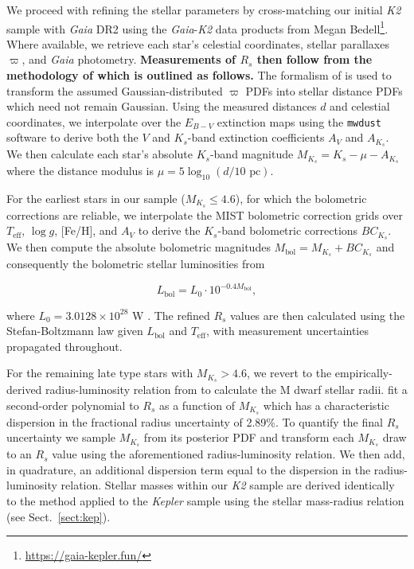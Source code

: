 \documentclass[twocolumn]{emulateapj}
\newcommand{\gaia}[1]{\emph{Gaia}#1}
\newcommand{\kepler}[1]{\emph{Kepler}#1}
\newcommand{\ktwo}[1]{\emph{K2}#1}
\newcommand{\teff}[1]{$T_{\text{eff}}$#1}
\newcommand{\logg}[1]{$\log{g}$#1}
\begin{document}
We proceed with refining the stellar parameters by cross-matching our initial \ktwo{} sample with \gaia{}  
DR2 using the \gaia{-}\ktwo{} data products from Megan Bedell\footnote{\url{https://gaia-kepler.fun/}}. Where
available, we retrieve each star's celestial coordinates, stellar parallaxes $\varpi$, and \gaia{} photometry.
\textbf{Measurements of $R_s$ then follow from the methodology of \cite{berger18} which is outlined as follows.}
The formalism of \cite{bailerjones18} is used to transform the assumed
Gaussian-distributed $\varpi$ PDFs into stellar distance PDFs which need not remain Gaussian.
Using the measured distances $d$ and celestial coordinates, we interpolate over the $E_{B-V}$ extinction maps using the
\texttt{mwdust} software \citep{bovy16} to derive both the $V$ and $K_s$-band extinction coefficients $A_V$ and
$A_{K_s}$. We then calculate each star's absolute $K_s$-band magnitude $M_{K_s} = K_s - \mu - A_{K_s}$ where
the distance modulus is $\mu = 5\log_{10}(d/10\text{ pc})$.

For the earliest stars in our sample ($M_{K_s}\leq 4.6$), for which the bolometric corrections
are reliable, we interpolate the MIST bolometric correction grids \citep{choi16} over \teff{,} \logg{,} [Fe/H],
and $A_V$ to derive the $K_s$-band bolometric corrections $BC_{K_s}$. We then compute the
absolute bolometric magnitudes $M_{\text{bol}}=M_{K_s} + BC_{K_s}$ and consequently the bolometric stellar
luminosities from

\begin{equation}
  L_{\text{bol}} = L_0 \cdot 10^{-0.4 M_{\text{bol}}},
\end{equation}

\noindent where $L_0 = 3.0128 \times 10^{28}$ W \citep{mamajek15}. The refined $R_s$ values
are then calculated using the Stefan-Boltzmann law given $L_{\text{bol}}$ and \teff{,} with measurement uncertainties
propagated throughout.

For the remaining late type stars with $M_{K_s}>4.6$, we revert to the empirically-derived radius-luminosity relation
from \cite{mann15} to calculate the M dwarf stellar radii. \cite{mann15} fit a second-order polynomial to $R_s$ as
a function of $M_{K_s}$ which has a characteristic dispersion in the fractional radius uncertainty of 2.89\%. To quantify
the final $R_s$ uncertainty we sample $M_{K_s}$ from its posterior PDF and transform each $M_{K_s}$ draw to an $R_s$ value
using the aforementioned radius-luminosity relation. We then add, in quadrature, an additional dispersion term equal to
the dispersion in the radius-luminosity relation. Stellar masses within our \ktwo{} sample are derived
identically to the method applied to the \kepler{} sample using the \cite{boyajian12} stellar
mass-radius relation (see Sect.~\ref{sect:kep}). 
\end{document}
